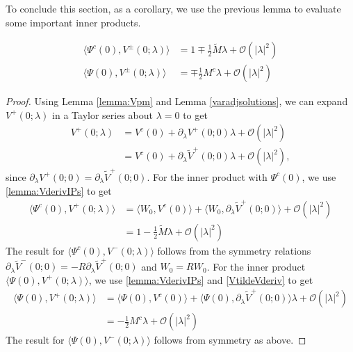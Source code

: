 \documentclass[thesis.tex]{subfiles}
\begin{document}
To conclude this section, as a corollary, we use the previous lemma to evaluate some important inner products.

\begin{corollary}\label{lemma:VpmPsiIP}
\begin{equation}\label{VpmIPs}
\begin{aligned}
\langle \Psi^c(0), V^\pm(0; \lambda) \rangle &= 1 \mp \frac{1}{2} \tilde{M}\lambda + \mathcal{O}(|\lambda|^2) \\
\langle \Psi(0), V^\pm(0; \lambda) \rangle &= \mp \frac{1}{2} M^c \lambda + \mathcal{O}(|\lambda|^2)
\end{aligned}
\end{equation}
\begin{proof}
Using Lemma \ref{lemma:Vpm} and Lemma \ref{varadjsolutions}, we can expand $V^+(0; \lambda)$ in a Taylor series about $\lambda = 0$ to get
\begin{align*}
V^+(0; \lambda) &= V^c(0) + \partial_\lambda V^+(0; 0) \lambda + \mathcal{O}(|\lambda|^2) \\
&= V^c(0) + \partial_\lambda \tilde{V}^+(0; 0) \lambda + \mathcal{O}(|\lambda|^2), 
\end{align*}
since $\partial_\lambda V^+(0; 0) = \partial_\lambda \tilde{V}^+(0; 0)$. For the inner product with $\Psi^c(0)$, we use \cref{lemma:VderivIPs} to get
\begin{align*}
\langle \Psi^c(0), V^+(0; \lambda) \rangle &= 
\langle W_0, V^c(0) \rangle + \langle W_0, \partial_\lambda \tilde{V}^+(0; 0) \rangle + \mathcal{O}(|\lambda|^2) \\
&= 1 - \frac{1}{2} \tilde{M}\lambda + \mathcal{O}(|\lambda|^2)
\end{align*}
The result for $\langle \Psi^c(0), V^-(0; \lambda) \rangle$ follows from the symmetry relations $\partial_\lambda \tilde{V}^-(0; 0)= -R \partial_\lambda \tilde{V}^+(0; 0)$ and $W_0 = R W_0$. For the inner product $\langle \Psi(0), V^+(0; \lambda) \rangle$, we use \cref{lemma:VderivIPs} and \cref{VtildeVderiv} to get
\begin{align*}
\langle \Psi(0), V^+(0; \lambda) \rangle 
&= \langle \Psi(0), V^c(0) \rangle + \langle \Psi(0), \partial_\lambda \tilde{V}^+(0; 0) \rangle \lambda  + \mathcal{O}(|\lambda|^2) \\
&= -\frac{1}{2} M^c \lambda + \mathcal{O}(|\lambda|^2)
\end{align*}
The result for $\langle \Psi(0), V^-(0; \lambda) \rangle$ follows from symmetry as above.
\end{proof}
\end{corollary}
\end{document}
